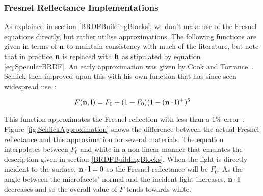 \subsubsection{Fresnel Reflectance Implementations}

As explained in section \ref{BRDFBuildingBlocks}, we don't make use of the Fresnel equations directly, but rather utilise approximations. The following functions are given in terms of \begin{math}\mathbf{n}\end{math} to maintain consistency with much of the literature, but note that in practice \begin{math}\mathbf{n}\end{math} is replaced with \begin{math}\mathbf{h}\end{math} as stipulated by equation \ref{eq:SpecularBRDF}. An early approximation was given by Cook and Torrance~\cite{CookTorrance}. Schlick then improved upon this with his own function that has since seen widespread use~\cite{SchlickApproximation}:

\begin{equation} \label{eq:SchlickAppoximation}
	F(\mathbf{n}, \mathbf{l}) = F_0 + (1 - F_0)(1 - (\mathbf{n}\cdot\mathbf{l})^+)^5
\end{equation}

This function approximates the Fresnel reflection with less than a 1\% error~\cite{SchlickApproximation}. Figure \ref{fig:SchlickApproximation} shows the difference between the actual Fresnel reflectance and this approximation for several materials. The equation interpolates between \begin{math}F_0\end{math} and white in a non-linear manner that emulates the description given in section \ref{BRDFBuildingBlocks}. When the light is directly incident to the surface, \begin{math}\mathbf{n}\cdot\mathbf{l} = 0\end{math} so the Fresnel reflectance will be \begin{math}F_0\end{math}. As the angle between the microfacets' normal and the incident light increases, \begin{math}\mathbf{n}\cdot\mathbf{l}\end{math} decreases and so the overall value of \begin{math}F\end{math} tends towards white.

